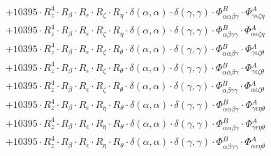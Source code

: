 \documentclass{article}
\begin{document}
\begin{subequations}
\begin{gather}
\begin{array}{c}
 \\[0.2em] 		 + 10395 \cdot R_{z}^{4} \cdot R_{\beta{}} \cdot R_{\epsilon{}} \cdot R_{\zeta{}} \cdot R_{\eta{}} \cdot \delta{}\left(\alpha{}, \alpha{}\right) \cdot \delta{}\left(\gamma{}, \gamma{}\right) \cdot \Phi{}^{B}_{\alpha{}\alpha{}\beta{}\gamma{}} \cdot \Phi{}^{A}_{\gamma{}\epsilon{}\zeta{}\eta{}} 
 \\[0.2em] 		 + 10395 \cdot R_{z}^{4} \cdot R_{\beta{}} \cdot R_{\epsilon{}} \cdot R_{\zeta{}} \cdot R_{\eta{}} \cdot \delta{}\left(\alpha{}, \alpha{}\right) \cdot \delta{}\left(\gamma{}, \gamma{}\right) \cdot \Phi{}^{B}_{\alpha{}\beta{}\gamma{}\gamma{}} \cdot \Phi{}^{A}_{\alpha{}\epsilon{}\zeta{}\eta{}} 
 \\[0.2em] 		 + 10395 \cdot R_{z}^{4} \cdot R_{\beta{}} \cdot R_{\epsilon{}} \cdot R_{\zeta{}} \cdot R_{\theta{}} \cdot \delta{}\left(\alpha{}, \alpha{}\right) \cdot \delta{}\left(\gamma{}, \gamma{}\right) \cdot \Phi{}^{B}_{\alpha{}\alpha{}\beta{}\gamma{}} \cdot \Phi{}^{A}_{\gamma{}\epsilon{}\zeta{}\theta{}} 
 \\[0.2em] 		 + 10395 \cdot R_{z}^{4} \cdot R_{\beta{}} \cdot R_{\epsilon{}} \cdot R_{\zeta{}} \cdot R_{\theta{}} \cdot \delta{}\left(\alpha{}, \alpha{}\right) \cdot \delta{}\left(\gamma{}, \gamma{}\right) \cdot \Phi{}^{B}_{\alpha{}\alpha{}\beta{}\gamma{}} \cdot \Phi{}^{A}_{\gamma{}\epsilon{}\zeta{}\theta{}} 
 \\[0.2em] 		 + 10395 \cdot R_{z}^{4} \cdot R_{\beta{}} \cdot R_{\epsilon{}} \cdot R_{\zeta{}} \cdot R_{\theta{}} \cdot \delta{}\left(\alpha{}, \alpha{}\right) \cdot \delta{}\left(\gamma{}, \gamma{}\right) \cdot \Phi{}^{B}_{\alpha{}\beta{}\gamma{}\gamma{}} \cdot \Phi{}^{A}_{\alpha{}\epsilon{}\zeta{}\theta{}} 
 \\[0.2em] 		 + 10395 \cdot R_{z}^{4} \cdot R_{\beta{}} \cdot R_{\epsilon{}} \cdot R_{\eta{}} \cdot R_{\theta{}} \cdot \delta{}\left(\alpha{}, \alpha{}\right) \cdot \delta{}\left(\gamma{}, \gamma{}\right) \cdot \Phi{}^{B}_{\alpha{}\alpha{}\beta{}\gamma{}} \cdot \Phi{}^{A}_{\gamma{}\epsilon{}\eta{}\theta{}} 
 \\[0.2em] 		 + 10395 \cdot R_{z}^{4} \cdot R_{\beta{}} \cdot R_{\epsilon{}} \cdot R_{\eta{}} \cdot R_{\theta{}} \cdot \delta{}\left(\alpha{}, \alpha{}\right) \cdot \delta{}\left(\gamma{}, \gamma{}\right) \cdot \Phi{}^{B}_{\alpha{}\alpha{}\beta{}\gamma{}} \cdot \Phi{}^{A}_{\gamma{}\epsilon{}\eta{}\theta{}} 
 \\[0.2em] 		 + 10395 \cdot R_{z}^{4} \cdot R_{\beta{}} \cdot R_{\epsilon{}} \cdot R_{\eta{}} \cdot R_{\theta{}} \cdot \delta{}\left(\alpha{}, \alpha{}\right) \cdot \delta{}\left(\gamma{}, \gamma{}\right) \cdot \Phi{}^{B}_{\alpha{}\beta{}\gamma{}\gamma{}} \cdot \Phi{}^{A}_{\alpha{}\epsilon{}\eta{}\theta{}} 

\end{array}
\end{gather}
\end{subequations}
\end{document}
